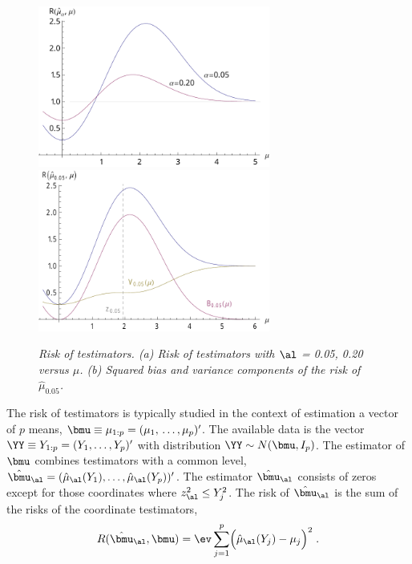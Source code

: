 \documentclass[12pt]{article}
\begin{document}
 \begin{figure}
 \caption{ \label{fig:risk} \sl Risk of testimators. (a) Risk of testimators with
 $\al$ = 0.05, 0.20 versus $\mu$. (b) Squared bias and variance components of the
 risk of $\hat\mu_{0.05}$. } 
 \vspace{0.1in}
\centerline{
 \includegraphics[width=3.0in]{figures/risk_a}
 \includegraphics[width=3.0in]{figures/risk_b} }
 \vspace{0.2in}
 \end{figure}
 

 The risk of testimators is typically studied in the context of
 estimation a vector of $p$ means, $\bmu \equiv \mu_{1:p} =
 (\mu_1, \,\ldots, \mu_p)'$.  The available data is the vector $\YY \equiv Y_{1:p} =
 (Y_1, \ldots, Y_p)'$ with distribution $\YY \sim N(\bmu,I_p)$.  The estimator
 of $\bmu$ combines testimators with a common level, $\hat{\bmu}_\al =
 (\hat\mu_\al(Y_1), \ldots, \hat\mu_\al(Y_p))'$.  The estimator $\hat{\bmu}_\al$
 consists of zeros except for those coordinates where $z_\al^2 \le Y_j^2$.  The
 risk of $\hat{\bmu}_\al$ is the sum of the risks of the coordinate testimators,
 \begin{equation}
    R(\hat{\bmu}_\al, \bmu) 
      = \ev \sum_{j=1}^p \Bigl( \hat{\mu}_{\al}(Y_j) - \mu_j \Bigr)^2 \;.
 \label{eq:risk}
 \end{equation}
\end{document}
